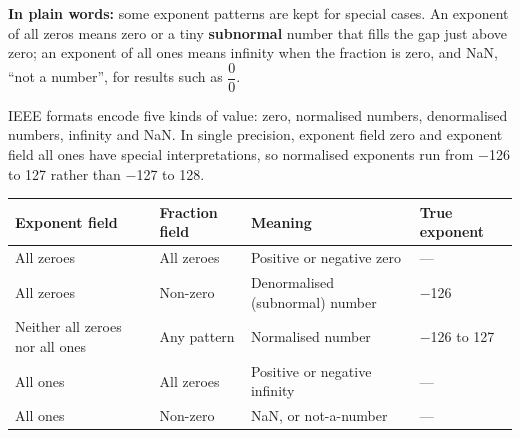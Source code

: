 \documentclass[11pt]{article}
\begin{document}
\begin{keepsection}
\begin{center}
\begin{minipage}[t]{0.303\linewidth}\centering
{}\par{}\end{minipage}
\end{center}

\begin{plainbox}\textbf{In plain words:} some exponent patterns are kept for special cases. An exponent of all zeros means zero or a tiny \textbf{subnormal} number that fills the gap just above zero; an exponent of all ones means infinity when the fraction is zero, and NaN, “not a number”, for results such as {\small\ensuremath{\dfrac{0}{0}}}.\end{plainbox}

IEEE formats encode five kinds of value: zero, normalised numbers, denormalised numbers, infinity and NaN. In single precision, exponent field zero and exponent field all ones have special interpretations, so normalised exponents run from \ensuremath{-}126 to 127 rather than \ensuremath{-}127 to 128.

\begin{center}\small\begin{tabularx}{\linewidth}{>{\raggedright\arraybackslash}X>{\raggedright\arraybackslash}X>{\raggedright\arraybackslash}X>{\raggedright\arraybackslash}X}\toprule
\textbf{Exponent field} & \textbf{Fraction field} & \textbf{Meaning} & \textbf{True exponent} \\ \midrule
All zeroes & All zeroes & Positive or negative zero & — \\
All zeroes & Non-zero & Denormalised (subnormal) number & \ensuremath{-}126 \\
Neither all zeroes nor all ones & Any pattern & Normalised number & \ensuremath{-}126 to 127 \\
All ones & All zeroes & Positive or negative infinity & — \\
All ones & Non-zero & NaN, or not-a-number & — \\
\bottomrule\end{tabularx}\end{center}


\end{keepsection}
\end{document}
